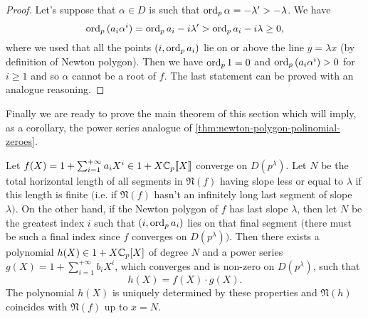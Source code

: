 		\begin{proof}
			Let's suppose that $\alpha \in D$ is such that $\textrm{ord}_p\, \alpha = -\lambda' > -\lambda$. We have
			\[
				\textrm{ord}_p\,(a_i\alpha^i) = \textrm{ord}_p\, a_i -i\lambda' > \textrm{ord}_p\, a_i -i\lambda \geq 0,
			\]
			where we used that all the points $(i, \textrm{ord}_p\, a_i)$ lie on or above the line $y=\lambda x$ (by definition of Newton polygon). Then we have $\textrm{ord}_p\, 1 = 0$ and $\textrm{ord}_p\,(a_i\alpha^i) > 0$ for $i \geq 1$ and so $\alpha$ cannot be a root of $f$. The last statement can be proved with an analogue reasoning.
		\end{proof}
		Finally we are ready to prove the main theorem of this section which will imply, as a corollary, the power series analogue of \cref{thm:newton-polygon-polinomial-zeroes}.
		\begin{thm}
			\label{thm:weierstrass-padic-preparation}
			Let $f(X) = 1 + \sum_{i=1}^{+\infty} a_iX^i \in 1 + X\mathbb{C}_p\llbracket {X} \rrbracket$ converge on $D(p^{\lambda})$. Let $N$ be the total horizontal length of all segments in $\mathfrak{N}(f)$ having slope less or equal to $\lambda$ if this length is finite $($i.e. if $\mathfrak{N}(f)$ hasn't an infinitely long last segment of slope $\lambda)$. On the other hand, if the Newton polygon of $f$ has last slope $\lambda$, then let $N$ be the greatest index $i$ such that $(i, \textrm{ord}_p\, a_i)$ lies on that final segment $($there must be such a final index since $f$ converges on $D(p^{\lambda}))$. Then there exists a polynomial $h(X) \in 1 + X\mathbb{C}_p[X]$ of degree $N$ and a power series $g(X) = 1 + \sum_{i=1}^{+\infty} b_iX^i$, which converges and is non-zero on $D(p^{\lambda})$, such that
			\[
				h(X) = f(X) \cdot g(X).
			\]
			The polynomial $h(X)$ is uniquely determined by these properties and $\mathfrak{N}(h)$ coincides with $\mathfrak{N}(f)$ up to $x = N$.
		\end{thm}

